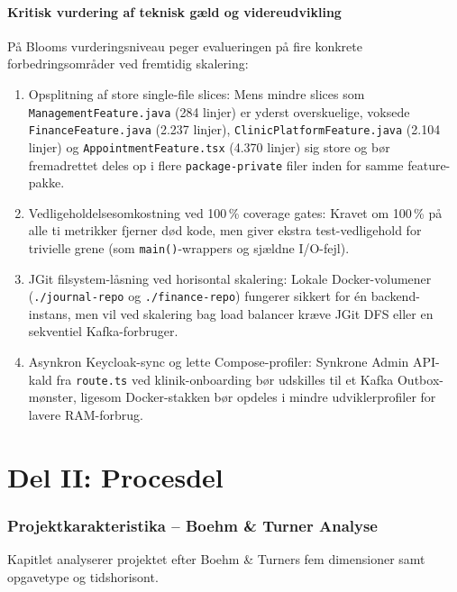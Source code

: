 \documentclass[11pt,a4paper]{article}
\begin{document}
\subsection{Kritisk vurdering af teknisk gæld og videreudvikling}
På Blooms vurderingsniveau \cite{bloom1956} peger evalueringen på fire konkrete forbedringsområder ved fremtidig skalering:
\begin{enumerate}[noitemsep]
    \item Opsplitning af store single-file slices: Mens mindre slices som \texttt{ManagementFeature.java} (284 linjer) er yderst overskuelige, voksede \texttt{FinanceFeature.java} (2.237 linjer), \texttt{ClinicPlatformFeature.java} (2.104 linjer) og \texttt{AppointmentFeature.tsx} (4.370 linjer) sig store og bør fremadrettet deles op i flere \texttt{package-private} filer inden for samme feature-pakke.
    \item Vedligeholdelsesomkostning ved 100\,\% coverage gates: Kravet om 100\,\% på alle ti metrikker fjerner død kode, men giver ekstra test-vedligehold for trivielle grene (som \texttt{main()}-wrappers og sjældne I/O-fejl).
    \item JGit filsystem-låsning ved horisontal skalering: Lokale Docker-volumener (\texttt{./journal-repo} og \texttt{./finance-repo}) fungerer sikkert for én backend-instans, men vil ved skalering bag load balancer kræve JGit DFS eller en sekventiel Kafka-forbruger.
    \item Asynkron Keycloak-sync og lette Compose-profiler: Synkrone Admin API-kald fra \texttt{route.ts} ved klinik-onboarding bør udskilles til et Kafka Outbox-mønster, ligesom Docker-stakken bør opdeles i mindre udviklerprofiler for lavere RAM-forbrug.
\end{enumerate}

\newpage
\part*{Del II: Procesdel}

\section{Projektkarakteristika -- Boehm \& Turner Analyse}
Kapitlet analyserer projektet efter Boehm \& Turners fem dimensioner samt opgavetype og tidshorisont.
\end{document}
